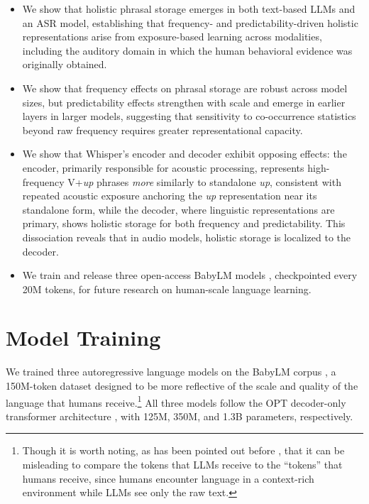\documentclass[11pt]{article}
\begin{document}
\begin{itemize}
\item
  We show that holistic phrasal storage emerges in both text-based LLMs
  and an ASR model, establishing that frequency- and
  predictability-driven holistic representations arise from
  exposure-based learning across modalities, including the auditory
  domain in which the human behavioral evidence was originally obtained.
\item
  We show that frequency effects on phrasal storage are robust across
  model sizes, but predictability effects strengthen with scale and
  emerge in earlier layers in larger models, suggesting that sensitivity
  to co-occurrence statistics beyond raw frequency requires greater
  representational capacity.
\item
  We show that Whisper's encoder and decoder exhibit opposing effects:
  the encoder, primarily responsible for acoustic processing, represents
  high-frequency V+\emph{up} phrases \emph{more} similarly to standalone
  \emph{up}, consistent with repeated acoustic exposure anchoring the
  \emph{up} representation near its standalone form, while the decoder,
  where linguistic representations are primary, shows holistic storage
  for both frequency and predictability. This dissociation reveals that
  in audio models, holistic storage is localized to the decoder.
\item
  We train and release three open-access BabyLM models
  \citep{charpentier2025babylm}, checkpointed every 20M tokens, for
  future research on human-scale language learning.
\end{itemize}

\section{Model Training}\label{model-training}

We trained three autoregressive language models on the BabyLM corpus
\citep{charpentier2025babylm}, a 150M-token dataset designed to be more
reflective of the scale and quality of the language that humans
receive.\footnote{Though it is worth noting, as has been pointed out
  before \citep[e.g.,][]{houghton2025multiwordrepresentationsminds},
  that it can be misleading to compare the tokens that LLMs receive to
  the ``tokens'' that humans receive, since humans encounter language in
  a context-rich environment while LLMs see only the raw text.} All
three models follow the OPT decoder-only transformer architecture
\citep{zhang2022opt}, with 125M, 350M, and 1.3B parameters,
respectively.
\end{document}
